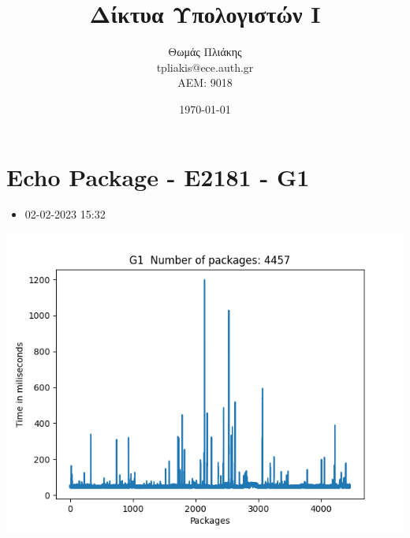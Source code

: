 \documentclass[10pt,a4paper]{article}
\title{ Δίκτυα Υπολογιστών Ι}
\author{Θωμάς Πλιάκης \\ \textlatin{tpliakis@ece.auth.gr} \\ AEM: 9018}
\date{\today}
\begin{document}
\maketitle


\section*{\textlatin{Echo Package - E2181 - G1}}
\begin{itemize}
  \item 02-02-2023 15:32
        \newline
        \newline
        \newline
        \newline
\end{itemize}
\begin{center}
  \includegraphics[scale=0.8]{G1.png}
  \newline
  \newline
  \newline
  \newline
  \newline
  \newline
  \newline
  \newline
  \newline
  \newline
  \newline
  \newline
  \newline
  \newline
\end{center}
\end{document}
